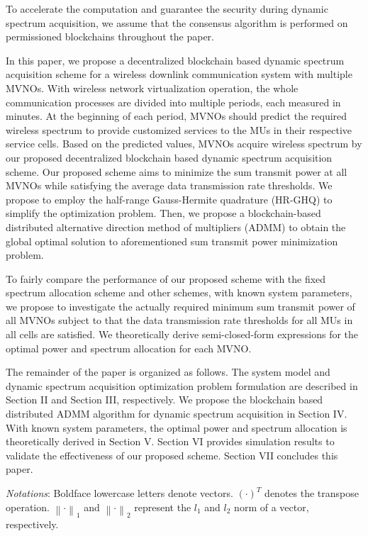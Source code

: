 \documentclass[journal]{IEEEtran}
\begin{document}
{To accelerate the computation and guarantee the security during dynamic spectrum acquisition, we assume that the consensus algorithm is performed on permissioned blockchains throughout the paper.}

In this paper, we propose a decentralized blockchain based dynamic spectrum acquisition scheme for a wireless downlink communication system with multiple MVNOs. With wireless network virtualization operation, the whole communication processes are divided into multiple periods, each measured in minutes. At the beginning of each period, MVNOs should predict the required wireless spectrum to provide customized services to the MUs in their respective service cells. Based on the predicted values, MVNOs acquire wireless spectrum by our proposed decentralized blockchain based dynamic spectrum acquisition scheme. Our proposed scheme aims to minimize the sum transmit power at all MVNOs while satisfying the average data transmission rate thresholds. We propose to employ the half-range Gauss-Hermite quadrature (HR-GHQ) to simplify the optimization problem. Then, we propose a blockchain-based distributed alternative direction method of multipliers (ADMM) to obtain the global optimal solution to aforementioned sum transmit power minimization problem.

To fairly compare the performance of our proposed scheme with the fixed spectrum allocation scheme and other schemes, with known system parameters, we propose to investigate the {\color{red}actually} required minimum sum transmit power of all MVNOs subject to that the data transmission rate thresholds for all MUs in all cells are satisfied. We theoretically derive semi-closed-form expressions for the optimal power and spectrum allocation for each MVNO.

The remainder of the paper is organized as follows. The system model and dynamic spectrum acquisition optimization problem formulation are described in Section II and Section III, respectively. We propose the blockchain based distributed ADMM algorithm for dynamic spectrum acquisition in Section IV. With known system parameters, the optimal power and spectrum allocation is theoretically derived in Section V. Section VI provides simulation results to validate the effectiveness of our proposed scheme. Section VII concludes this paper.

\emph{Notations}: Boldface lowercase letters denote vectors. $\left(\cdot\right)^T$ denotes the transpose operation. $\left\|\cdot \right\|_1$ and $\left\|\cdot \right\|_2$ represent the $l_1$ and $l_2$ norm of a vector, respectively.
\end{document}

